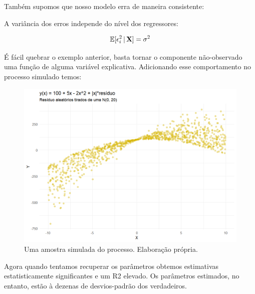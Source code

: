 Também supomos que nosso modelo erra de maneira consistente:

\begin{hipotese}[Homocedasticidade]
A variância dos erros independe do nível dos regressores:

\begin{align}
    \mathbb{E}[\epsilon_i^2\, |\, \mathbf{X} ] = \sigma^2
\end{align}


\end{hipotese}

\begin{exemplo}[Heterocedasticidade]
É fácil quebrar o exemplo anterior, basta tornar o componente não-observado uma função de alguma variável explicativa. Adicionando esse comportamento no processo simulado temos:

\begin{figure}[H]
    \centering
    \includegraphics[scale = .75]{imagens/exemplo_heteroske.png}
    \caption{Uma amostra simulada do processo. Elaboração própria.}
\end{figure}

Agora quando tentamos recuperar os parâmetros obtemos estimativas estatisticamente significantes e um R2 elevado. Os parâmetros estimados, no entanto, estão à dezenas de desvios-padrão dos verdadeiros.





\end{exemplo}




